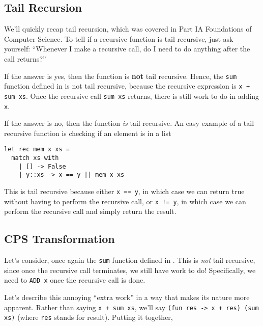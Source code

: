 \subsection{Tail Recursion}\label{subsection:tailrecursion}
We'll quickly recap tail recursion, which was covered in {\sffamily Part IA Foundations of Computer Science}. To tell if a recursive function is tail recursive, just ask yourself: “Whenever I make a recursive call, do I need to do anything after the call returns?”

If the answer is yes, then the function is \textbf{not} tail recursive. Hence, the \texttt{sum} function defined in  is not tail recursive, because the recursive expression is \texttt{x + sum xs}. Once the recursive call \texttt{sum xs} returns, there is still work to do in adding \texttt{x}.

If the answer is no, then the function \emph{is} tail recursive. An easy example of a tail recursive function is checking if an element is in a list

\begin{code}
\label{code:mem-cps-ocaml}
\begin{verbatim}
let rec mem x xs = 
  match xs with
    | [] -> False
    | y::xs -> x == y || mem x xs 
\end{verbatim}
\end{code}

This is tail recursive because either \texttt{x == y}, in which case we can return true without having to perform the recursive call, or \texttt{x != y}, in which case we can perform the recursive call and simply return the result. 

\subsection{CPS Transformation}\label{subsection:cps-transform}
Let's consider, once again the \texttt{sum} function defined in . This is \emph{not} tail recursive, since once the recursive call terminates, we still have work to do! Specifically, we need to \texttt{ADD x} once the recursive call is done. 

Let's describe this annoying ``extra work'' in a way that makes its nature more apparent. Rather than saying \texttt{x + sum xs}, we'll say \texttt{(fun res -> x + res) (sum xs)} (where \texttt{res} stands for result). Putting it together, 

